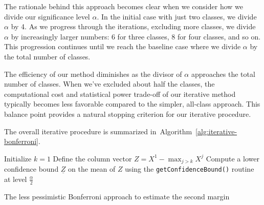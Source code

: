 The rationale behind this approach becomes clear when we consider how we divide our significance level $\alpha$.
In the initial case with just two classes, we divide $\alpha$ by 4.
As we progress through the iterations, excluding more classes, we divide $\alpha$ by increasingly larger numbers: 6 for three classes, 8 for four classes, and so on.
This progression continues until we reach the baseline case where we divide $\alpha$ by the total number of classes.

The efficiency of our method diminishes as the divisor of $\alpha$ approaches the total number of classes.
When we've excluded about half the classes, the computational cost and statistical power trade-off of our iterative method typically becomes less favorable compared to the simpler, all-class approach.
This balance point provides a natural stopping criterion for our iterative procedure.

The overall iterative procedure is summarized in~Algorithm~\ref{alg:iterative-bonferroni}.
\begin{algorithm}[htbp]
    \DontPrintSemicolon %
    Initialize $k = 1$\;
    Define the column vector $Z = X^1 - \max_{j>k} X^j$\;
    Compute a lower confidence bound $\underline{Z}$ on the mean of $Z$ using the \texttt{getConfidenceBound()} routine at level $\frac{\alpha}{2}$\;
    \caption{The less pessimistic Bonferroni approach to estimate the second margin}\label{alg:iterative-bonferroni}
\end{algorithm}
